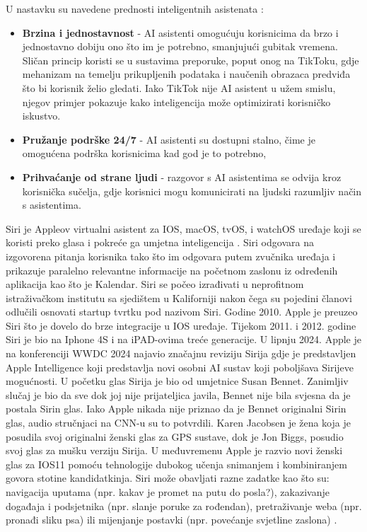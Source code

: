 \documentclass[]{foi}
\begin{document}
U nastavku su navedene prednosti inteligentnih asistenata \cite{buchan2024ai}:
\begin{itemize}
    \item \textbf{Brzina i jednostavnost} - AI asistenti omogućuju korisnicima da brzo i jednostavno dobiju ono što im je potrebno, smanjujući
    gubitak vremena. Sličan princip koristi se u sustavima preporuke, poput onog na TikToku, gdje mehanizam na temelju prikupljenih podataka i naučenih obrazaca predviđa
    što bi korisnik želio gledati. Iako TikTok nije AI asistent u užem smislu, njegov primjer pokazuje kako inteligencija može optimizirati korisničko iskustvo.
    \item \textbf{Pružanje podrške 24/7} - AI asistenti su dostupni stalno, čime je omogućena podrška korisnicima kad god je to potrebno, 
    \item \textbf{Prihvaćanje od strane ljudi} - razgovor s AI asistentima se odvija kroz korisnička sučelja, gdje korisnici mogu
    komunicirati na ljudski razumljiv način s asistentima. 
\end{itemize}

Siri je Appleov virtualni asistent za IOS, macOS, tvOS, i watchOS uređaje koji se koristi preko glasa i pokreće ga umjetna inteligencija \cite{mixon_siri_2025}. Siri odgovara na izgovorena pitanja korisnika
tako što im odgovara putem zvučnika uređaja i prikazuje paralelno relevantne informacije na početnom zaslonu iz određenih aplikacija kao što je Kalendar. Siri se počeo izrađivati
u neprofitnom istraživačkom institutu sa sjedištem u Kaliforniji nakon čega su pojedini članovi odlučili osnovati startup tvrtku pod nazivom Siri. Godine 2010. Apple je preuzeo Siri što
je dovelo do brze integracije u IOS uređaje. Tijekom 2011. i 2012. godine Siri je bio na Iphone 4S i na iPAD-ovima treće generacije. U lipnju 2024. Apple je na konferenciji WWDC 2024 najavio značajnu
reviziju Sirija gdje je predstavljen Apple Intelligence koji predstavlja novi osobni AI sustav koji poboljšava Sirijeve mogućnosti. U početku glas Sirija je bio od umjetnice Susan Bennet. Zanimljiv slučaj
je bio da sve dok joj nije prijateljica javila, Bennet nije bila svjesna da je postala Sirin glas. Iako Apple nikada nije priznao da je Bennet originalni Sirin glas, audio stručnjaci na CNN-u
su to potvrdili. Karen Jacobsen je žena koja je posudila svoj originalni ženski glas za GPS sustave, dok je Jon Biggs, posudio svoj glas za mušku verziju Sirija. U međuvremenu Apple je razvio novi ženski glas za IOS11
pomoću tehnologije dubokog učenja snimanjem i kombiniranjem govora stotine kandidatkinja. Siri može obavljati razne zadatke kao što su: navigacija uputama (npr. kakav je promet na putu do posla?),
zakazivanje događaja i podsjetnika (npr. slanje poruke za rođendan), pretraživanje weba (npr. pronađi sliku psa) ili mijenjanje postavki (npr. povećanje svjetline zaslona) \cite{mixon_siri_2025}.
\end{document}
